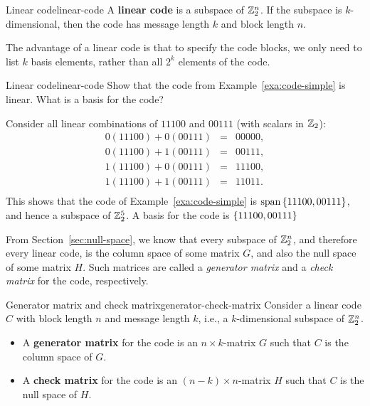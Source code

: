 \begin{definition}{Linear code}{linear-code}
  A \textbf{linear code}%
   is a subspace of
  $\mathbb{Z}_2^n$. If the subspace is $k$-dimensional, then the code has
  message length $k$ and block length $n$.
\end{definition}

The advantage of a linear code is that to specify the code blocks, we
only need to list $k$ basis elements, rather than all $2^k$ elements
of the code.

\begin{example}{Linear code}{linear-code}
  Show that the code from Example~\ref{exa:code-simple} is
  linear. What is a basis for the code?
\end{example}

\begin{solution}
  Consider all linear combinations of $11100$ and $00111$ (with
  scalars in $\mathbb{Z}_2$):
  \begin{equation*}
    \begin{array}{rcl}
      0(11100) + 0(00111) &=& 00000, \\
      0(11100) + 1(00111) &=& 00111, \\
      1(11100) + 0(00111) &=& 11100, \\
      1(11100) + 1(00111) &=& 11011. \\
    \end{array}
  \end{equation*}
  This shows that the code of Example~\ref{exa:code-simple} is
  $\sspan\set{11100, 00111}$, and hence a subspace of $\mathbb{Z}_2^5$. A
  basis for the code is $\left\{11100, 00111\right\}$
\end{solution}

From Section~\ref{sec:null-space}, we know that every subspace of
$\mathbb{Z}_2^n$, and therefore every linear code, is the column space of some
matrix $G$, and also the null space of some matrix $H$. Such matrices
are called a {\em generator matrix} and a {\em check matrix} for the
code, respectively.

\begin{definition}{Generator matrix and check matrix}{generator-check-matrix}
  Consider a linear code $C$ with block length $n$ and message length
  $k$, i.e., a $k$-dimensional subspace of $\mathbb{Z}_2^n$.
  \begin{itemize}
  \item A \textbf{generator matrix}%
     for the code is an
    $n\times k$-matrix $G$ such that $C$ is the column space of $G$.
  \item A \textbf{check matrix}%
     for the code is an
    $(n-k)\times n$-matrix $H$ such that $C$ is the null space of $H$.
  \end{itemize}
\end{definition}

